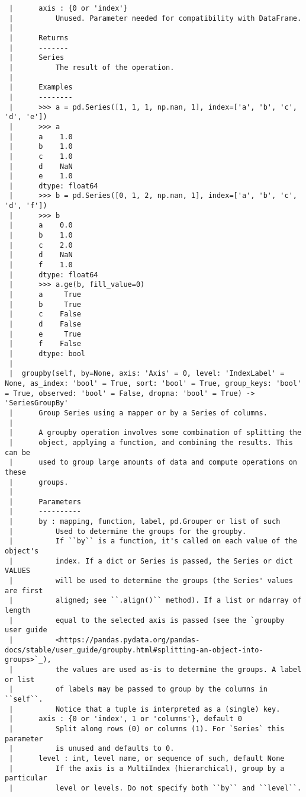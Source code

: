 \documentclass[
  letterpaper,
  DIV=11,
  numbers=noendperiod]{scrreprt}
\begin{document}
\begin{verbatim}
 |      axis : {0 or 'index'}
 |          Unused. Parameter needed for compatibility with DataFrame.
 |      
 |      Returns
 |      -------
 |      Series
 |          The result of the operation.
 |      
 |      Examples
 |      --------
 |      >>> a = pd.Series([1, 1, 1, np.nan, 1], index=['a', 'b', 'c', 'd', 'e'])
 |      >>> a
 |      a    1.0
 |      b    1.0
 |      c    1.0
 |      d    NaN
 |      e    1.0
 |      dtype: float64
 |      >>> b = pd.Series([0, 1, 2, np.nan, 1], index=['a', 'b', 'c', 'd', 'f'])
 |      >>> b
 |      a    0.0
 |      b    1.0
 |      c    2.0
 |      d    NaN
 |      f    1.0
 |      dtype: float64
 |      >>> a.ge(b, fill_value=0)
 |      a     True
 |      b     True
 |      c    False
 |      d    False
 |      e     True
 |      f    False
 |      dtype: bool
 |  
 |  groupby(self, by=None, axis: 'Axis' = 0, level: 'IndexLabel' = None, as_index: 'bool' = True, sort: 'bool' = True, group_keys: 'bool' = True, observed: 'bool' = False, dropna: 'bool' = True) -> 'SeriesGroupBy'
 |      Group Series using a mapper or by a Series of columns.
 |      
 |      A groupby operation involves some combination of splitting the
 |      object, applying a function, and combining the results. This can be
 |      used to group large amounts of data and compute operations on these
 |      groups.
 |      
 |      Parameters
 |      ----------
 |      by : mapping, function, label, pd.Grouper or list of such
 |          Used to determine the groups for the groupby.
 |          If ``by`` is a function, it's called on each value of the object's
 |          index. If a dict or Series is passed, the Series or dict VALUES
 |          will be used to determine the groups (the Series' values are first
 |          aligned; see ``.align()`` method). If a list or ndarray of length
 |          equal to the selected axis is passed (see the `groupby user guide
 |          <https://pandas.pydata.org/pandas-docs/stable/user_guide/groupby.html#splitting-an-object-into-groups>`_),
 |          the values are used as-is to determine the groups. A label or list
 |          of labels may be passed to group by the columns in ``self``.
 |          Notice that a tuple is interpreted as a (single) key.
 |      axis : {0 or 'index', 1 or 'columns'}, default 0
 |          Split along rows (0) or columns (1). For `Series` this parameter
 |          is unused and defaults to 0.
 |      level : int, level name, or sequence of such, default None
 |          If the axis is a MultiIndex (hierarchical), group by a particular
 |          level or levels. Do not specify both ``by`` and ``level``.

\end{verbatim}
\end{document}
